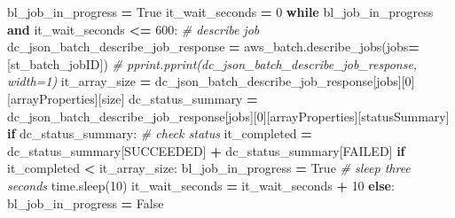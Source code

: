 \documentclass[
]{book}
\newenvironment{Shaded}{\begin{snugshade}}{\end{snugshade}}
\newcommand{\CommentTok}[1]{\textcolor[rgb]{0.56,0.35,0.01}{\textit{#1}}}
\newcommand{\ControlFlowTok}[1]{\textcolor[rgb]{0.13,0.29,0.53}{\textbf{#1}}}
\newcommand{\DecValTok}[1]{\textcolor[rgb]{0.00,0.00,0.81}{#1}}
\newcommand{\KeywordTok}[1]{\textcolor[rgb]{0.13,0.29,0.53}{\textbf{#1}}}
\newcommand{\NormalTok}[1]{#1}
\newcommand{\OperatorTok}[1]{\textcolor[rgb]{0.81,0.36,0.00}{\textbf{#1}}}
\newcommand{\StringTok}[1]{\textcolor[rgb]{0.31,0.60,0.02}{#1}}
\newcommand{\VariableTok}[1]{\textcolor[rgb]{0.00,0.00,0.00}{#1}}
\begin{document}
\begin{Shaded}
\begin{Highlighting}[]
\NormalTok{bl\_job\_in\_progress }\OperatorTok{=} \VariableTok{True}
\NormalTok{it\_wait\_seconds }\OperatorTok{=} \DecValTok{0}
\ControlFlowTok{while}\NormalTok{ bl\_job\_in\_progress }\KeywordTok{and}\NormalTok{ it\_wait\_seconds }\OperatorTok{\textless{}=} \DecValTok{600}\NormalTok{:}
    \CommentTok{\# describe job}
\NormalTok{    dc\_json\_batch\_describe\_job\_response }\OperatorTok{=}\NormalTok{ aws\_batch.describe\_jobs(jobs}\OperatorTok{=}\NormalTok{[st\_batch\_jobID])}
    \CommentTok{\# pprint.pprint(dc\_json\_batch\_describe\_job\_response, width=1)}
\NormalTok{    it\_array\_size }\OperatorTok{=}\NormalTok{ dc\_json\_batch\_describe\_job\_response[}\StringTok{\textquotesingle{}jobs\textquotesingle{}}\NormalTok{][}\DecValTok{0}\NormalTok{][}\StringTok{\textquotesingle{}arrayProperties\textquotesingle{}}\NormalTok{][}\StringTok{\textquotesingle{}size\textquotesingle{}}\NormalTok{]}
\NormalTok{    dc\_status\_summary }\OperatorTok{=}\NormalTok{ dc\_json\_batch\_describe\_job\_response[}\StringTok{\textquotesingle{}jobs\textquotesingle{}}\NormalTok{][}\DecValTok{0}\NormalTok{][}\StringTok{\textquotesingle{}arrayProperties\textquotesingle{}}\NormalTok{][}\StringTok{\textquotesingle{}statusSummary\textquotesingle{}}\NormalTok{]}
    \ControlFlowTok{if}\NormalTok{ dc\_status\_summary:}
        \CommentTok{\# check status}
\NormalTok{        it\_completed }\OperatorTok{=}\NormalTok{ dc\_status\_summary[}\StringTok{\textquotesingle{}SUCCEEDED\textquotesingle{}}\NormalTok{] }\OperatorTok{+}\NormalTok{ dc\_status\_summary[}\StringTok{\textquotesingle{}FAILED\textquotesingle{}}\NormalTok{]}
        \ControlFlowTok{if}\NormalTok{ it\_completed }\OperatorTok{\textless{}}\NormalTok{ it\_array\_size:}
\NormalTok{            bl\_job\_in\_progress }\OperatorTok{=} \VariableTok{True}
            \CommentTok{\# sleep three seconds}
\NormalTok{            time.sleep(}\DecValTok{10}\NormalTok{)}
\NormalTok{            it\_wait\_seconds }\OperatorTok{=}\NormalTok{ it\_wait\_seconds }\OperatorTok{+} \DecValTok{10}
        \ControlFlowTok{else}\NormalTok{:}
\NormalTok{            bl\_job\_in\_progress }\OperatorTok{=} \VariableTok{False}
            

\end{Highlighting}
\end{Shaded}
\end{document}

